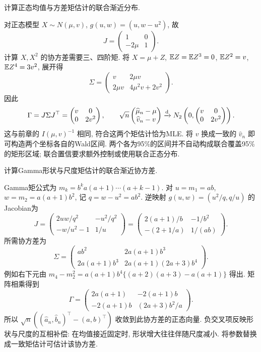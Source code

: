 \begin{example}
计算正态均值与方差矩估计的联合渐近分布.
\end{example}
\begin{solution}
对正态模型 $X\sim N(\mu,v)$, $g(u,w)=(u,w-u^2)$, 故
\[
 J=\begin{pmatrix}1&0\\-2\mu&1\end{pmatrix}.
\]
计算 $X,X^2$ 的协方差需要三、四阶矩. 将 $X=\mu+Z$, $\mathbb E Z=\mathbb E Z^3=0$, $\mathbb E Z^2=v$, $\mathbb E Z^4=3v^2$, 展开得
\[
 \Sigma=\begin{pmatrix}
 v&2\mu v\\
 2\mu v&4\mu^2v+2v^2
 \end{pmatrix}.
\]
因此
\[
 \Gamma=J\Sigma J^\top=\begin{pmatrix}v&0\\0&2v^2\end{pmatrix},\qquad
 \sqrt n\begin{pmatrix}\widehat\mu_n-\mu\\\widehat v_n-v\end{pmatrix}
 \xrightarrow{\mathrm d} N_2\left(0,\begin{pmatrix}v&0\\0&2v^2\end{pmatrix}\right).
\]
这与前章的 $I(\mu,v)^{-1}$ 相同, 符合这两个矩估计恰为MLE. 将 $v$ 换成一致的 $\widehat v_n$ 即可构造两个坐标各自的Wald区间. 两个各为95\%的区间并不自动构成联合覆盖95\%的矩形区域; 联合置信要求额外控制或使用联合正态分布.
\end{solution}

\begin{example}
计算Gamma形状与尺度矩估计的联合渐近协方差.
\end{example}
\begin{solution}
Gamma矩公式为 $m_k=b^ka(a+1)\cdots(a+k-1)$. 对 $u=m_1=ab$, $w=m_2=a(a+1)b^2$, 记 $q=w-u^2=ab^2$. 逆映射 $g(u,w)=(u^2/q,q/u)$ 的Jacobian为
\[
 J=\begin{pmatrix}
 2uw/q^2&-u^2/q^2\\
 -w/u^2-1&1/u
 \end{pmatrix}
 =\begin{pmatrix}
 2(a+1)/b&-1/b^2\\
 -(2+1/a)&1/(ab)
 \end{pmatrix}.
\]
所需协方差为
\[
 \Sigma=\begin{pmatrix}
 ab^2&2a(a+1)b^3\\
 2a(a+1)b^3&2a(a+1)(2a+3)b^4
 \end{pmatrix}.
\]
例如右下元由 $m_4-m_2^2=a(a+1)b^4\{(a+2)(a+3)-a(a+1)\}$ 得出. 矩阵相乘得到
\[
 \Gamma=\begin{pmatrix}
 2a(a+1)&-2(a+1)b\\
 -2(a+1)b&(2a+3)b^2/a
 \end{pmatrix}.
\]
所以 $\sqrt n((\widehat a_n,\widehat b_n)^\top-(a,b)^\top)$ 收敛到此协方差的正态向量. 负交叉项反映形状与尺度的互相补偿: 在均值接近固定时, 形状增大往往伴随尺度减小. 将参数替换成一致矩估计可估计该协方差.
\end{solution}

